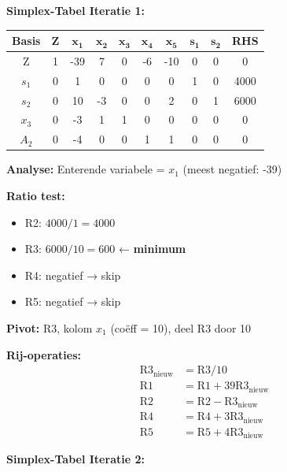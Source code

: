 \documentclass[a4paper,11pt]{article}
\begin{document}
\begin{oefenblok}[title=Lineair Programmeren — Rylon Parfums]
\vspace{0.3cm}

\textbf{Simplex-Tabel Iteratie 1:}

\begin{center}
\small
\begin{tabular}{|c|c|c|c|c|c|c|c|c|c|}
\hline
\textbf{Basis} & \textbf{Z} & $\mathbf{x_1}$ & $\mathbf{x_2}$ & $\mathbf{x_3}$ & $\mathbf{x_4}$ & $\mathbf{x_5}$ & $\mathbf{s_1}$ & $\mathbf{s_2}$ & \textbf{RHS} \\
\hline
Z & 1 & -39 & 7 & 0 & -6 & -10 & 0 & 0 & 0 \\
\hline
$s_1$ & 0 & 1 & 0 & 0 & 0 & 0 & 1 & 0 & 4000 \\
\hline
$s_2$ & 0 & 10 & -3 & 0 & 0 & 2 & 0 & 1 & 6000 \\
\hline
$x_3$ & 0 & -3 & 1 & 1 & 0 & 0 & 0 & 0 & 0 \\
\hline
$A_2$ & 0 & -4 & 0 & 0 & 1 & 1 & 0 & 0 & 0 \\
\hline
\end{tabular}
\end{center}

\textbf{Analyse:} Enterende variabele = $x_1$ (meest negatief: -39)

\textbf{Ratio test:}
\begin{itemize}
    \item R2: $4000/1 = 4000$
    \item R3: $6000/10 = 600$ ← \textbf{minimum}
    \item R4: negatief → skip
    \item R5: negatief → skip
\end{itemize}

\textbf{Pivot:} R3, kolom $x_1$ (coëff = 10), deel R3 door 10

\textbf{Rij-operaties:}
\begin{align*}
\text{R3}_{\text{nieuw}} &= \text{R3}/10 \\
\text{R1} &= \text{R1} + 39\text{R3}_{\text{nieuw}} \\
\text{R2} &= \text{R2} - \text{R3}_{\text{nieuw}} \\
\text{R4} &= \text{R4} + 3\text{R3}_{\text{nieuw}} \\
\text{R5} &= \text{R5} + 4\text{R3}_{\text{nieuw}}
\end{align*}

\vspace{0.3cm}

\textbf{Simplex-Tabel Iteratie 2:}


\end{oefenblok}
\end{document}
